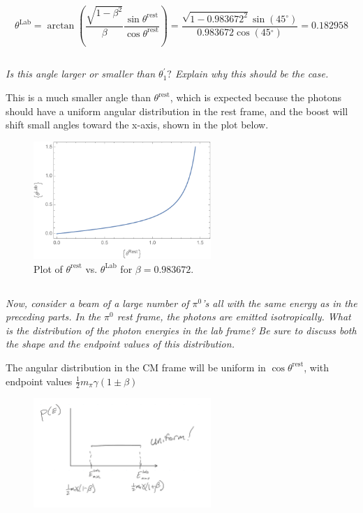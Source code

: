 \documentclass{article}
\begin{document}
$$\boxed{\theta^\mathrm{Lab} = \arctan{\left(\frac{\sqrt{1-\beta^{2}}}{\beta} \frac{\sin \theta^{\mathrm{rest}}}{  \cos \theta^{\mathrm{rest}}}\right)} = \frac{\sqrt{1-0.983672^2} \sin (45 {}^{\circ})}{0.983672 \cos (45 {}^{\circ})}= 0.182958}$$

\subsection{}
\textit{Is this angle larger or smaller than $\theta_{1}^{\prime} ?$ Explain why this should be the case.}

This is a much smaller angle than $\theta^{\mathrm{rest}}$, which is expected because the photons should have a uniform angular distribution in the rest frame, and the boost will shift small angles toward the x-axis, shown in the plot below. 

\begin{figure}[H]
    \centering
    \includegraphics[width=0.6\textwidth]{figures/thetaRestThetaLab.pdf}
    \caption{Plot of $\theta^{\mathrm{rest}}$ vs. $\theta^{\mathrm{Lab}}$ for $\beta = 0.983672$.}
    \label{fig:my_label}
\end{figure}

\subsection{}
\textit{Now, consider a beam of a large number of $\pi^{0}$'s all with the same energy as in the preceding parts. In the $\pi^{0}$ rest frame, the photons are emitted isotropically. What is the distribution of the photon energies in the lab frame? Be sure to discuss both the shape and the endpoint values of this distribution.}

The angular distribution in the CM frame will be uniform in $\cos \theta^{\mathrm{rest}}$, with endpoint values $\frac{1}{2} m_{\pi} \gamma(1\pm \beta)$

\begin{figure}[H]
    \centering
    \includegraphics[width=0.6\textwidth]{figures/angularPiDistribution.png}
    \label{fig:my_label}
\end{figure}
\end{document}

